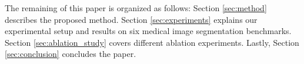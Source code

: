 The remaining of this paper is organized as follows: Section \ref{sec:method} describes the proposed method. Section \ref{sec:experiments} explains our experimental setup and results on six medical image segmentation benchmarks. Section \ref{sec:ablation_study} covers different ablation experiments. Lastly, Section \ref{sec:conclusion} concludes the paper. 


